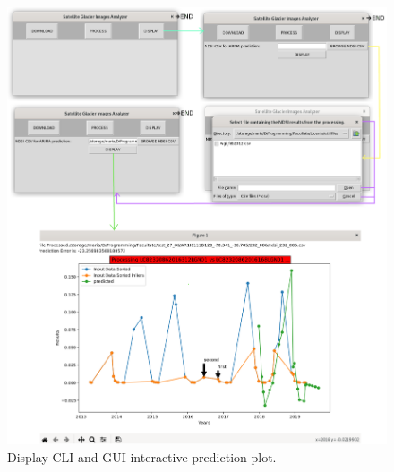 \documentclass[12pt, a4paper]{report}
\begin{document}
	\begin{figure}[H]
		\centering
		\includegraphics[scale=1.5]{DISPLAY_cmd_gui.png}
		\caption{Display CLI and GUI interactive prediction plot.}
		\label{fig:display_gui}
	\end{figure}
	
\end{document}
